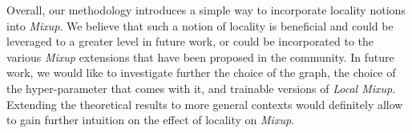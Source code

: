 \documentclass[twoside]{article}
\numberwithin{intassumption}{assumption}
\begin{document}
Overall, our methodology introduces a simple way to incorporate locality notions into \emph{Mixup}. We believe that such a notion of locality is beneficial and could be leveraged to a greater level in future work, or could be incorporated to the various \emph{Mixup} extensions that have been proposed in the community.
In future work, we would like to investigate further the choice of the graph, the choice of the hyper-parameter that comes with it, and trainable versions of \emph{Local Mixup}. Extending the theoretical results to more general contexts would definitely allow to gain further intuition on the effect of locality on \emph{Mixup}.


\end{document}
